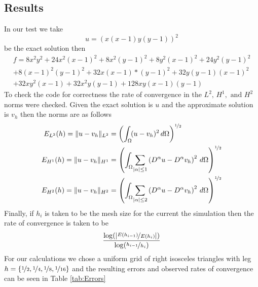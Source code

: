 \subsection{Results}
In our test we take 
\begin{equation}
  u=\left( x\left( x-1 \right)y\left( y-1 \right) \right)^2 
  \label{eqn:u}
\end{equation}
be the exact solution then
\begin{equation}\begin{split}
   f= 8x^2y^2 + 24x^2(x - 1)^2 + 8x^2(y - 1)^2 + 8y^2(x - 1)^2 + 24y^2(y - 1)^2 \\
   + 8(x - 1)^2(y - 1)^2 + 32x(x - 1)*(y - 1)^2 + 32y(y - 1)(x - 1)^2 \\
   + 32xy^2(x - 1) + 32x^2y( y - 1) + 128xy(x - 1)(y - 1)
 \end{split}
   \label{eqn:f}
\end{equation}
To check the code for correctness the rate of convergence in the
$L^2,\,H^1,\text{ and } H^2$ norms were checked. Given the exact solution is $u$
and the approximate solution is $v_{h}$ then the norms are as follows
\begin{align*}
  E_{L^2}(h)=\|u-v_h\|_{L^2} &= \left(\int_{\Omega}\! (u-v_h)^2 \,d\Omega\right)^{\nicefrac{1}{2}}\\
  E_{H^1}(h)=\|u-v_h\|_{H^1} &= \left(\int_{\Omega}\! \sum_{|\alpha|\le 1}
    \left(D^{\alpha}u-D^{\alpha}v_h\right)^2 \,d\Omega\right)^{\nicefrac{1}{2}}\\
  E_{H^2}(h)=\|u-v_h\|_{H^2} &= \left(\int_{\Omega}\! \sum_{|\alpha|\le 2}
    \left(D^{\alpha}u-D^{\alpha}v_h\right)^2 \,d\Omega\right)^{\nicefrac{1}{2}}
\end{align*}
Finally, if $h_i$ is taken to be the mesh size for the current the simulation
then the rate of convergence is taken to be 
\begin{equation*}
  \dfrac{\log(|\nicefrac{E(h_{i-1})}{E(h_i)}|)}{\log(\nicefrac{h_{i-1}}{h_i})} 
\end{equation*}
For our calculations we chose a uniform grid of right isosceles triangles with
leg $h=\{\nicefrac{1}{2},\nicefrac{1}{4},\nicefrac{1}{8},\nicefrac{1}{16}\}$
and the resulting errors and observed rates of convergence can be seen in Table \ref{tab:Errors} 
